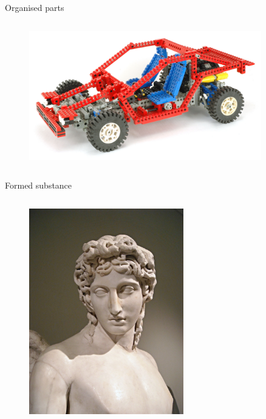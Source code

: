 \documentclass[xcolor=dvipsnames]{beamer}
\begin{document}
\begin{frame}[fragile]{Organised parts}
  \begin{columns}[T] %
    \begin{column}{0.99\textwidth}
      \begin{figure}[H]
        \centering
        \includegraphics[width=0.9\textwidth]{1988_8865_car}
      \end{figure}
    \end{column}%
  \end{columns}
\end{frame}


\begin{frame}[fragile]{Formed substance}
  \begin{columns}[T] %
    \begin{column}{0.99\textwidth}
      \begin{figure}[H]
        \centering
        \includegraphics[width=0.6\textwidth]{eros}
      \end{figure}
    \end{column}%
  \end{columns}
\end{frame}
\end{document}
